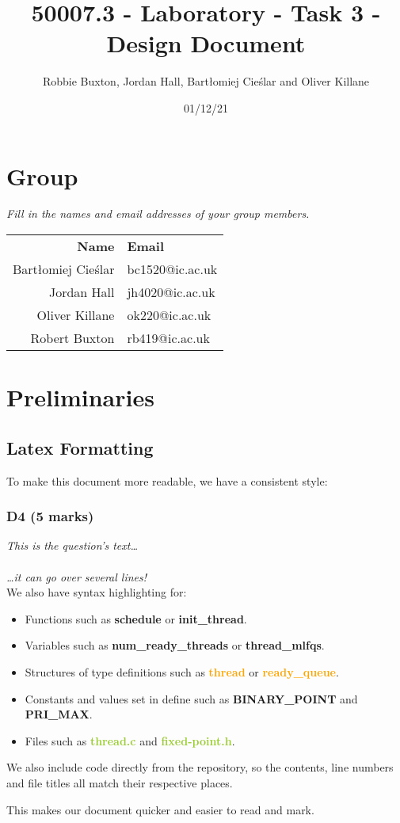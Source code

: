 \documentclass{report}
\title{50007.3 - Laboratory - Task 3 - Design Document}
\author{Robbie Buxton, Jordan Hall, Bartłomiej Cieślar and Oliver Killane}
\date{01/12/21}
\newcommand{\question}[1]{\textit{#1} \ }
\newcommand{\fun}[1]{\textcolor{Emerald}{\textbf{#1}}}
\newcommand{\file}[1]{\textcolor{YellowGreen}{\textbf{#1}}}
\newcommand{\struct}[1]{\textcolor{orange}{\textbf{#1}}}
\newcommand{\var}[1]{\textcolor{RoyalPurple}{\textbf{#1}}}
\newcommand{\const}[1]{\textcolor{BrickRed}{\textbf{#1}}}
\newcommand{\pintoscode}[4]{}
\begin{document}
	\maketitle

	\section*{Group}
		\question{Fill in the names and email addresses of your group members.}
		\begin{center}
			\begin{tabular}{r l}
				\textbf{Name} & \textbf{Email} \\
				Bartłomiej Cieślar & bc1520@ic.ac.uk \\
				Jordan Hall & jh4020@ic.ac.uk \\
				Oliver Killane & ok220@ic.ac.uk \\
				Robert Buxton & rb419@ic.ac.uk \\
			\end{tabular}
		\end{center}
	
	\section*{Preliminaries}
		\subsection*{Latex Formatting}
		To make this document more readable, we have a consistent style:
		\subsubsection*{D4 (5 marks)}
		\question{This is the question's text\dots
		\\
		\\ \dots it can go over several lines!}
		\\ We also have syntax highlighting for:
		\begin{itemize}
			\item Functions such as \fun{schedule} or \fun{init\_thread}.
			\item Variables such as \var{num\_ready\_threads} or 
			\var{thread\_mlfqs}.
			\item Structures of type definitions such as \struct{thread} or 
			\struct{ready\_queue}.
			\item Constants and values set in define such as 
			\const{BINARY\_POINT} and \const{PRI\_MAX}.
			\item Files such as \file{thread.c} and \file{fixed-point.h}.
		\end{itemize}
		We also include code directly from the repository, so the contents, line 
		numbers and file titles all match their respective places.
		\pintoscode{98}{110}{\file{syscall.c}}{/../userprog/syscall.c}
		This makes our document quicker and easier to read and mark.
\end{document}

